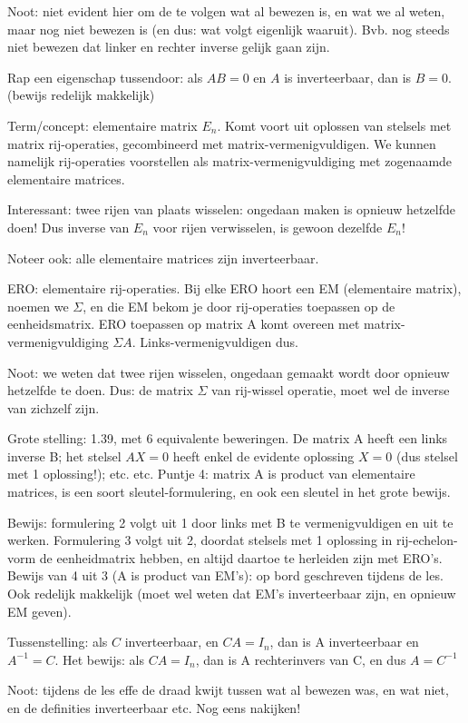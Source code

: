 \documentclass{article}
\begin{document}
Noot: niet evident hier om de te volgen wat al bewezen is, en wat we al weten, maar nog niet bewezen is (en dus: wat volgt eigenlijk waaruit). Bvb. nog steeds niet bewezen dat linker en rechter inverse gelijk gaan zijn. 

Rap een eigenschap tussendoor: als $AB=0$ en $A$ is inverteerbaar, dan is $B=0$. (bewijs redelijk makkelijk) 

Term/concept: elementaire matrix $E_n$. Komt voort uit oplossen van stelsels met matrix rij-operaties, gecombineerd met matrix-vermenigvuldigen. We kunnen namelijk rij-operaties voorstellen als matrix-vermenigvuldiging met zogenaamde elementaire matrices. 

Interessant: twee rijen van plaats wisselen: ongedaan maken is opnieuw hetzelfde doen! Dus inverse van $E_n$ voor rijen verwisselen, is gewoon dezelfde $E_n$! 

Noteer ook: alle elementaire matrices zijn inverteerbaar. 

ERO: elementaire rij-operaties. Bij elke ERO hoort een EM (elementaire matrix), noemen we $\Sigma$, en die EM bekom je door rij-operaties toepassen op de eenheidsmatrix. ERO toepassen op matrix A komt overeen met matrix-vermenigvuldiging $\Sigma A$. Links-vermenigvuldigen dus. 

Noot: we weten dat twee rijen wisselen, ongedaan gemaakt wordt door opnieuw hetzelfde te doen. Dus: de matrix $\Sigma$ van rij-wissel operatie, moet wel de inverse van zichzelf zijn. 

Grote stelling: 1.39, met 6 equivalente beweringen. De matrix A heeft een links inverse B; het stelsel $AX=0$ heeft enkel de evidente oplossing $X=0$ (dus stelsel met 1 oplossing!); etc. etc. Puntje 4: matrix A is product van elementaire matrices, is een soort sleutel-formulering, en ook een sleutel in het grote bewijs. 

Bewijs: formulering 2 volgt uit 1 door links met B te vermenigvuldigen en uit te werken. Formulering 3 volgt uit 2, doordat stelsels met 1 oplossing in rij-echelon-vorm de eenheidmatrix hebben, en altijd daartoe te herleiden zijn met ERO's. Bewijs van 4 uit 3 (A is product van EM's): op bord geschreven tijdens de les. Ook redelijk makkelijk (moet wel weten dat EM's inverteerbaar zijn, en opnieuw EM geven). 

Tussenstelling: als $C$ inverteerbaar, en $CA=I_n$, dan is A inverteerbaar en $A^{-1}=C$. Het bewijs: als $CA=I_n$, dan is A rechterinvers van C, en dus $A=C^{-1}$

Noot: tijdens de les effe de draad kwijt tussen wat al bewezen was, en wat niet, en de definities inverteerbaar etc. Nog eens nakijken! 
\end{document}
